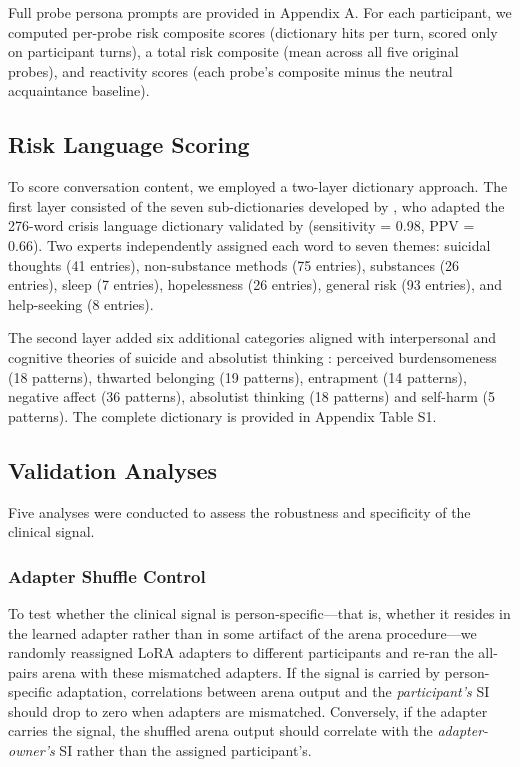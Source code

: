 \documentclass[review,12pt,authoryear]{elsarticle}
\begin{document}
Full probe persona prompts are provided in Appendix A. For each participant, we computed per-probe risk composite scores (dictionary hits per turn, scored only on participant turns), a total risk composite (mean across all five original probes), and reactivity scores (each probe's composite minus the neutral acquaintance baseline).

\subsection{Risk Language Scoring}

To score conversation content, we employed a two-layer dictionary approach. The first layer consisted of the seven sub-dictionaries developed by \citet{ammerman2026dictionary}, who adapted the 276-word crisis language dictionary validated by \citet{swaminathan2023nlp} (sensitivity = 0.98, PPV = 0.66). Two experts independently assigned each word to seven themes: suicidal thoughts (41 entries), non-substance methods (75 entries), substances (26 entries), sleep (7 entries), hopelessness (26 entries), general risk (93 entries), and help-seeking (8 entries).

The second layer added six additional categories aligned with interpersonal and cognitive theories of suicide \citep{oconnor2011integrated} and absolutist thinking \citep{almosaiwi2018absolute}: perceived burdensomeness (18 patterns), thwarted belonging (19 patterns), entrapment (14 patterns), negative affect (36 patterns), absolutist thinking (18 patterns) and self-harm (5 patterns). The complete dictionary is provided in Appendix Table S1.

\subsection{Validation Analyses}

Five analyses were conducted to assess the robustness and specificity of the clinical signal.

\subsubsection{Adapter Shuffle Control}

To test whether the clinical signal is person-specific---that is, whether it resides in the learned adapter rather than in some artifact of the arena procedure---we randomly reassigned LoRA adapters to different participants and re-ran the all-pairs arena with these mismatched adapters. If the signal is carried by person-specific adaptation, correlations between arena output and the \textit{participant's} SI should drop to zero when adapters are mismatched. Conversely, if the adapter carries the signal, the shuffled arena output should correlate with the \textit{adapter-owner's} SI rather than the assigned participant's.
\end{document}
